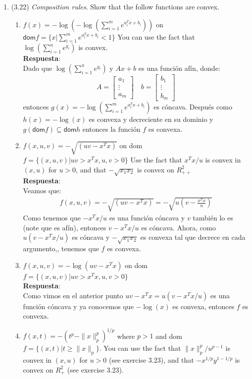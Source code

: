 \documentclass[12pt, oneside]{article}%
\begin{document}
\begin{enumerate}
\item (3.22) \textit{Composition rules}. Show that the follow functions are convex. 
\begin{enumerate}
    \item $f(x) = -\log(-\log (\sum_{i=1}^m e^{a_i^Tx+b_i}))$ on $\textsf{dom}f = \{x | \sum_{i=1}^m e^{a_i^Tx+b_i} < 1\}$ You can use the fact that $\log(\sum_{i=1}^n e^{y_i})$ is convex.\\
    \textbf{Respuesta}: \\
    Dado que $\log(\sum_{i=1}^n e^{y_i})$ y $Ax+b$ es una función afín, donde: 
    $$A=\begin{bmatrix}
    a_1\\
    \vdots\\
    a_m
    \end{bmatrix}\quad b=\begin{bmatrix}
    b_1\\
    \vdots\\
    b_m
    \end{bmatrix}$$
    entonces $g(x)=-\log (\sum_{i=1}^m e^{a_i^Tx+b_i})$ es cóncava. Después como $h(x)=-\log(x)$ es convexa y decreciente en su dominio y $g(\textsf{dom}f)\subseteq \textsf{dom} h$ entonces la función $f$ es convexa.
    \item $f(x,u,v) = -\sqrt{(uv-x^Tx)}$ on dom $f = \{(x,u,v) | uv > x^Tx, u, v > 0\}$ Use the fact that $x^Tx/u$ is convex in $(x,u)$ for $u > 0$, and that $-\sqrt{x_1x_2}$ is convex on $R_{++}^2$\\
    \textbf{Respuesta}: \\
    Veamos que:
    \begin{align*}
        f(x,u,v) =-\sqrt{(uv-x^Tx)}=-\sqrt{u(v-\frac{x^Tx}{u})}
    \end{align*}
    Como tenemos que $-x^Tx/u$ es una función cóncava y $v$ también lo es (note que es afín), entonces $v-x^Tx/u$ es cóncava. Ahora, como $u(v-x^Tx/u)$ es cóncava y $-\sqrt{x_1x_2}$ es convexa tal que decrece en cada argumento,, tenemos que $f$ es convexa.
    \item $f(x,u,v) = -\log(uv-x^Tx)$ on dom $f = \{(x,u,v) | uv > x^Tx, u,v > 0\}$\\
    \textbf{Respuesta}: \\
    Como vimos en el anterior punto $uv-x^Tx=u(v-x^Tx/u)$ es una función cóncava y ya conocemos que $-\log(x)$ es convexa, entonces $f$ es convexa.
    \item  $f(x,t) = -(t^p - \|x\|_p^p)^{1/p}$ where $p>1$ and dom $f = \{(x,t) | t \geq \|x\|_p\}$. You can use the fact that $\|x\|_p^p /u^{p-1}$ is convex in $(x,u)$ for $u > 0$  (see exercise 3.23), and that $-x^{1/p}y^{1-1/p}$ is convex on $R_+^2$ (see exercise 3.23).\\

\end{enumerate}
\end{enumerate}
\end{document}
